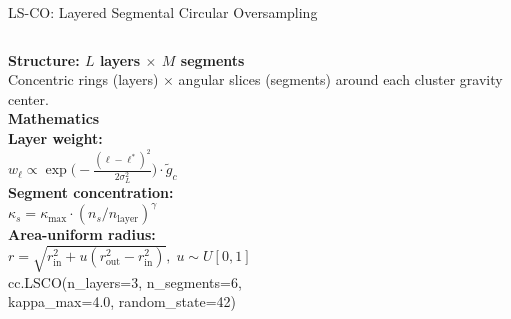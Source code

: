 \documentclass[aspectratio=169,10pt]{beamer}
\begin{document}
\begin{frame}[t]{LS-CO: Layered Segmental Circular Oversampling}
\begin{columns}[T]
{\small\bfseries\color{myblue}Structure: $L$ layers $\times$ $M$ segments}\\[2pt]
{\footnotesize
Concentric rings (layers) $\times$ angular slices (segments)
around each cluster gravity center.
}\\[2pt]
{\small\bfseries\color{myblue}Mathematics}\\[1pt]
{\footnotesize
\textbf{Layer weight:}\\
$w_\ell \propto \exp\!\bigl(-\tfrac{(\ell-\ell^*)^2}{2\sigma_L^2}\bigr)\cdot\tilde{g}_c$\\[3pt]
\textbf{Segment concentration:}\\
$\kappa_s = \kappa_\text{max}\cdot(n_s/n_\text{layer})^{\gamma}$\\[3pt]
\textbf{Area-uniform radius:}\\
$r = \sqrt{r_\text{in}^2 + u(r_\text{out}^2-r_\text{in}^2)},\;u\sim U[0,1]$
}\\[3pt]
{\scriptsize\ttfamily\color{myblue}
cc.LSCO(n\_layers=3, n\_segments=6,\\
\quad kappa\_max=4.0, random\_state=42)
}


\end{columns}
\end{frame}
\end{document}

